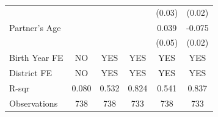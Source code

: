 \begin{longtable}{l*{5}{c}}
                    & & & & (0.03) & (0.02) \\
Partner's Age & & & & 0.039 & -0.075\sym{***} \\
                    & & & & (0.05) & (0.02) \\
\hline
Birth Year FE & NO & YES & YES & YES & YES \\
District FE & NO & YES & YES & YES & YES \\
R-sqr & 0.080 & 0.532 & 0.824 & 0.541 & 0.837 \\
Observations & 738 & 738 & 733 & 738 & 733 \\
\hline \hline

\end{longtable}